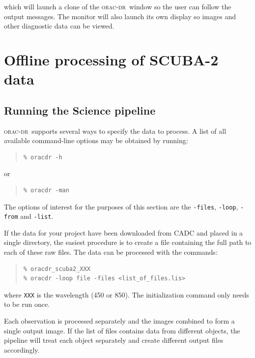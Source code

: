 \documentclass[twoside,11pt]{article}
\newcommand{\xlabel}[1]{}
\renewcommand{\_}{\texttt{\symbol{95}}}
\newenvironment{myquote}{\begin{quote}\begin{small}}{\end{small}\end{quote}}
\newcommand{\oracdr}{\textsc{orac-dr}}
\begin{document}
which will launch a clone of the \oracdr\ window so the user can follow
the output messages. The monitor will also launch its own display so
images and other diagnostic data can be viewed.


\section{\xlabel{offline}Offline processing of SCUBA-2 data\label{se:offline}}

\subsection{Running the Science pipeline}

\oracdr\ supports several ways to specify the data to process. A list
of all available command-line options may be obtained by running:

\begin{myquote}
\begin{verbatim}
% oracdr -h
\end{verbatim}
\end{myquote}

or

\begin{myquote}
\begin{verbatim}
% oracdr -man
\end{verbatim}
\end{myquote}

The options of interest for the purposes of this section are the
\verb+-files+, \verb+-loop+, \verb+-from+ and \verb+-list+.

If the data for your project have been downloaded from CADC and placed
in a single directory, the easiest procedure is to create a file
containing the full path to each of these raw files. The data can be
processed with the commands:

\begin{myquote}
\begin{verbatim}
% oracdr_scuba2_XXX
% oracdr -loop file -files <list_of_files.lis>
\end{verbatim}
\end{myquote}

where \verb+XXX+ is the wavelength (450 or 850). The initialization
command only needs to be run once.

Each observation is processed separately and the images combined to
form a single output image. If the list of files contains data from
different objects, the pipeline will treat each object separately and
create different output files accordingly.
\end{document}
